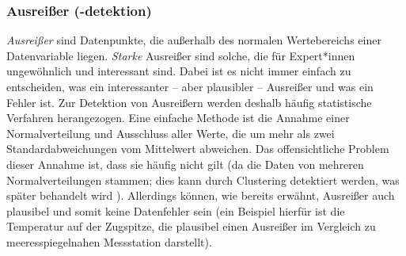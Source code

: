 		\subsubsection{Ausreißer (-detektion)}
			\emph{Ausreißer} sind Datenpunkte, die außerhalb des normalen Wertebereichs einer Datenvariable liegen. \emph{Starke} Ausreißer sind solche, die für Expert*innen ungewöhnlich und interessant sind. Dabei ist es nicht immer einfach zu entscheiden, was ein interessanter -- aber plausibler -- Ausreißer und was ein Fehler ist. Zur Detektion von Ausreißern werden deshalb häufig statistische Verfahren herangezogen. Eine einfache Methode ist die Annahme einer Normalverteilung und Ausschluss aller Werte, die um mehr als zwei Standardabweichungen vom Mittelwert abweichen. Das offensichtliche Problem dieser Annahme ist, dass sie häufig nicht gilt (\bspw da die Daten von mehreren Normalverteilungen stammen; dies kann durch Clustering detektiert werden, was später behandelt wird ). Allerdings können, wie bereits erwähnt, Ausreißer auch plausibel und somit keine Datenfehler sein (ein Beispiel hierfür ist die Temperatur auf der Zugspitze, die plausibel einen Ausreißer im Vergleich zu meeresspiegelnahen Messstation darstellt).

